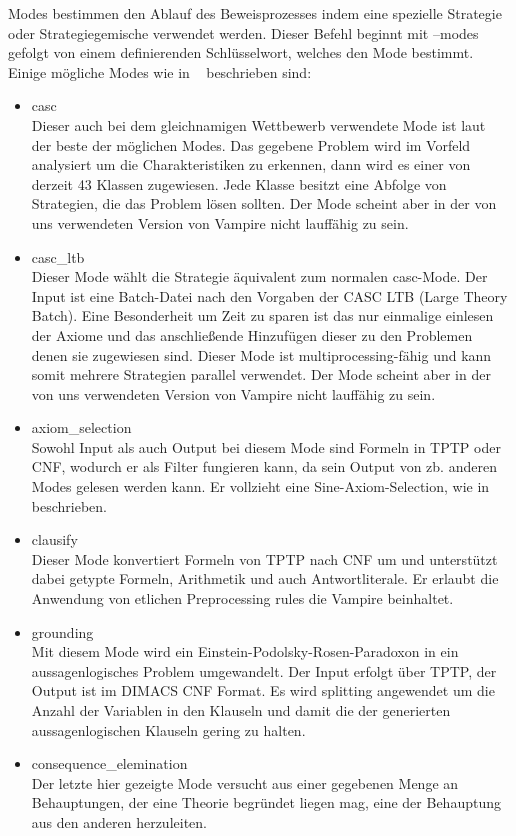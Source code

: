 \documentclass{acm_proc_article-sp-german}
\begin{document}
Modes bestimmen den Ablauf des Beweisprozesses indem eine spezielle Strategie oder Strategiegemische verwendet werden. 
Dieser Befehl beginnt mit \glqq --modes \grqq gefolgt von einem definierenden Schlüsselwort, welches den Mode bestimmt.
Einige mögliche Modes wie in ~\cite{hoder2011slides} beschrieben sind:
\begin{itemize}
\item casc \\
		Dieser auch bei dem gleichnamigen Wettbewerb verwendete Mode ist laut ~\cite{hoder2011slides}  der beste der möglichen Modes.
		Das gegebene Problem wird im Vorfeld analysiert um die Charakteristiken zu erkennen, dann wird es einer von derzeit 43 Klassen zugewiesen. Jede Klasse besitzt eine Abfolge von Strategien, die das Problem lösen sollten.
		Der Mode scheint aber in der von uns verwendeten Version von Vampire nicht lauffähig zu sein.\\
\item casc\_ltb \\
		Dieser Mode wählt die Strategie äquivalent zum normalen casc-Mode. Der Input ist eine Batch-Datei nach den Vorgaben der CASC LTB (Large Theory Batch). Eine Besonderheit um Zeit zu sparen ist das nur einmalige einlesen der Axiome und das anschließende Hinzufügen dieser zu den Problemen denen sie zugewiesen sind. Dieser Mode ist multiprocessing-fähig und kann somit mehrere Strategien parallel verwendet.
		Der Mode scheint aber in der von uns verwendeten Version von Vampire nicht lauffähig zu sein.\\
\item axiom\_selection \\
		Sowohl Input als auch Output bei diesem Mode sind Formeln in TPTP oder CNF, wodurch er als Filter fungieren kann, da sein Output von zb. anderen Modes gelesen werden kann.
		Er vollzieht eine Sine-Axiom-Selection, wie in ~\cite{sinquanon} beschrieben.\\
\item clausify \\
		Dieser Mode konvertiert Formeln von TPTP nach CNF um und unterstützt dabei getypte Formeln, Arithmetik und auch Antwortliterale. Er erlaubt die Anwendung von etlichen Preprocessing rules die Vampire beinhaltet. \\
\item grounding \\
		Mit diesem Mode wird ein Einstein-Podolsky-Rosen-Paradoxon in ein aussagenlogisches Problem umgewandelt. Der Input erfolgt über TPTP, der Output ist im DIMACS CNF Format.
		Es wird splitting angewendet um die Anzahl der Variablen in den Klauseln und damit die der generierten aussagenlogischen Klauseln gering zu halten. \\
\item consequence\_elemination \\
		Der letzte hier gezeigte Mode versucht aus einer gegebenen Menge an Behauptungen, der eine Theorie begründet liegen mag, eine der Behauptung aus den anderen herzuleiten.
\end{itemize}
\end{document}

